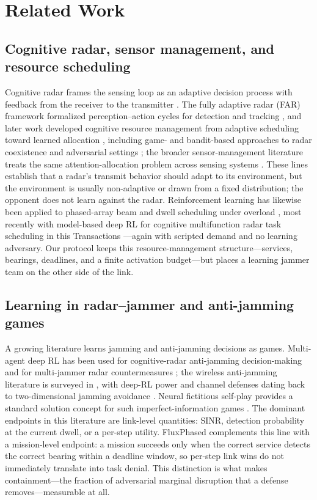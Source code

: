 \section{Related Work}
\subsection{Cognitive radar, sensor management, and resource scheduling}
Cognitive radar frames the sensing loop as an adaptive decision process with feedback from the receiver to the transmitter \cite{haykin2006cognitive}. The fully adaptive radar (FAR) framework formalized perception--action cycles for detection and tracking \cite{bell2014far,bell2015jstsp}, and later work developed cognitive resource management from adaptive scheduling toward learned allocation \cite{charlish2020development,martone2021waveform,moo2015book}, including game- and bandit-based approaches to radar coexistence and adversarial settings \cite{martone2018spectrum,howard2022bandits}; the broader sensor-management literature treats the same attention-allocation problem across sensing systems \cite{hero2011sensor}. These lines establish that a radar's transmit behavior should adapt to its environment, but the environment is usually non-adaptive or drawn from a fixed distribution; the opponent does not learn against the radar. Reinforcement learning has likewise been applied to phased-array beam and dwell scheduling under overload \cite{kosuru2022qlearn}, most recently with model-based deep RL for cognitive multifunction radar task scheduling in this Transactions \cite{akbar2025scheduling}---again with scripted demand and no learning adversary. Our protocol keeps this resource-management structure---services, bearings, deadlines, and a finite activation budget---but places a learning jammer team on the other side of the link.

\subsection{Learning in radar--jammer and anti-jamming games}
A growing literature learns jamming and anti-jamming decisions as games. Multi-agent deep RL has been used for cognitive-radar anti-jamming decision-making \cite{jiang2023dsp,wang2024ietrsn} and for multi-jammer radar countermeasures \cite{xie2023multijam}; the wireless anti-jamming literature is surveyed in \cite{jia2025survey}, with deep-RL power and channel defenses dating back to two-dimensional jamming avoidance \cite{han2017twodim}. Neural fictitious self-play provides a standard solution concept for such imperfect-information games \cite{heinrich2016deep}. The dominant endpoints in this literature are link-level quantities: SINR, detection probability at the current dwell, or a per-step utility. FluxPhased complements this line with a mission-level endpoint: a mission succeeds only when the correct service detects the correct bearing within a deadline window, so per-step link wins do not immediately translate into task denial. This distinction is what makes containment---the fraction of adversarial marginal disruption that a defense removes---measurable at all.

